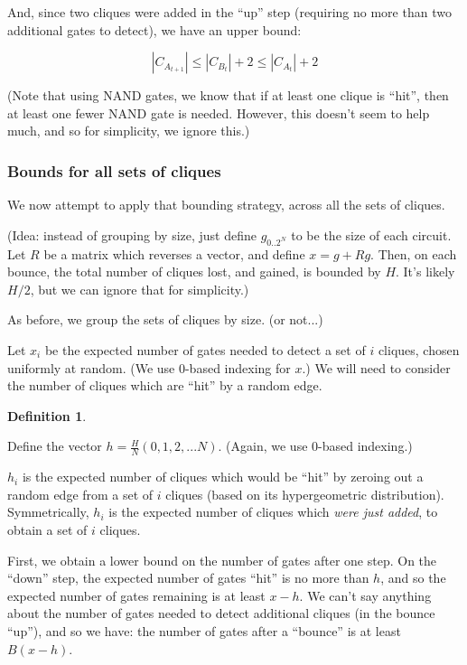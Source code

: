 \documentclass[12pt]{article}
\theoremstyle{definition}
\newtheorem{defn}{Definition}[section]
\begin{document}
And, since two cliques were added in the ``up'' step (requiring no more than two
additional gates to detect), we have an upper bound:

\[
|C_{A_{t+1}}| \le |C_{B_t}| + 2 \le |C_{A_t}| + 2
\]

(Note that using NAND gates, we know that if at least one clique is ``hit'', then
at least one fewer NAND gate is needed. However, this doesn't seem to help much,
and so for simplicity, we ignore this.)

\subsubsection{Bounds for all sets of cliques}

We now attempt to apply that bounding strategy, across all the sets of cliques.

(Idea: instead of grouping by size, just define $g_{0..2^N}$ to be the size of each circuit.
Let $R$ be a matrix which reverses a vector, and define $x = g + Rg$. Then,
on each bounce, the total number of cliques lost, and gained, is bounded by $H$.
It's likely $H/2$, but we can ignore that for simplicity.)

As before, we group the sets of cliques by size. (or not...)

Let $x_i$ be the expected number of gates needed to detect a set
of $i$ cliques, chosen uniformly at random. (We use 0-based indexing
for $x$.) We will need to consider the number of cliques which are ``hit''
by a random edge.

\begin{defn} \label{defn:sequenceVector}

Define the vector $h = \frac{H}{N}(0, 1, 2, ... N)$. (Again, we use 0-based indexing.)

$h_i$ is the expected number of cliques which would be ``hit'' by zeroing out a random edge
from a set of $i$ cliques (based on its hypergeometric distribution).
Symmetrically, $h_i$ is the expected number of cliques which {\em were just added}, to obtain a
set of $i$ cliques.

\end{defn}

First, we obtain a lower bound on the number of gates after one step.
On the ``down'' step, the expected number of gates ``hit'' is no more than $h$,
and so the expected number of gates remaining is at least $x - h$.
We can't say anything about the number of gates needed to detect additional cliques (in the bounce ``up''), and so we have:
the number of gates after a ``bounce'' is at least $B(x-h)$.
\end{document}
